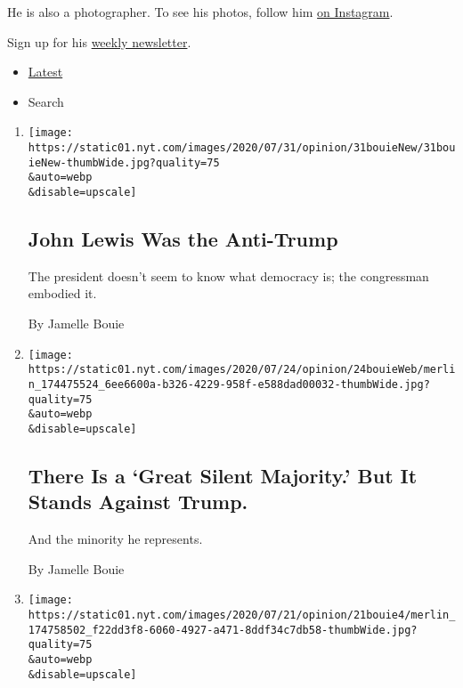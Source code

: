 He is also a photographer. To see his photos, follow him
\href{https://www.instagram.com/jbouie/?hl=en}{on Instagram}.

Sign up for his
\href{https://www.nytimes.com/newsletters/jamellebouie}{weekly
newsletter}.

\begin{itemize}
\tightlist
\item
  \protect\hyperlink{stream-panel}{Latest}
\item
  Search
\end{itemize}

\begin{enumerate}
\def\labelenumi{\arabic{enumi}.}
\item
  \href{/2020/07/31/opinion/john-lewis-trump-election-2020.html}{}

  \texttt{[image: https://static01.nyt.com/images/2020/07/31/opinion/31bouieNew/31bouieNew-thumbWide.jpg?quality=75\\\&auto=webp\\\&disable=upscale]}

  \hypertarget{john-lewis-was-the-anti-trump}{%
  \subsection{John Lewis Was the
  Anti-Trump}\label{john-lewis-was-the-anti-trump}}

  The president doesn't seem to know what democracy is; the congressman
  embodied it.

  By Jamelle Bouie
\item
  \href{/2020/07/24/opinion/trump-silent-majority.html}{}

  \texttt{[image: https://static01.nyt.com/images/2020/07/24/opinion/24bouieWeb/merlin\_174475524\_6ee6600a-b326-4229-958f-e588dad00032-thumbWide.jpg?quality=75\\\&auto=webp\\\&disable=upscale]}

  \hypertarget{there-is-a-great-silent-majority-but-it-stands-against-trump}{%
  \subsection{There Is a `Great Silent Majority.' But It Stands Against
  Trump.}\label{there-is-a-great-silent-majority-but-it-stands-against-trump}}

  And the minority he represents.

  By Jamelle Bouie
\item
  \href{/2020/07/21/opinion/portland-homeland-security.html}{}

  \texttt{[image: https://static01.nyt.com/images/2020/07/21/opinion/21bouie4/merlin\_174758502\_f22dd3f8-6060-4927-a471-8ddf34c7db58-thumbWide.jpg?quality=75\\\&auto=webp\\\&disable=upscale]}


\end{enumerate}
